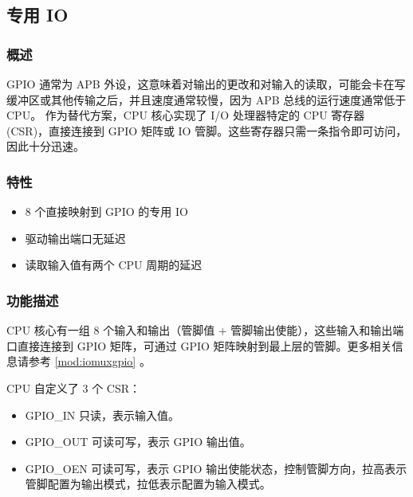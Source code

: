 \documentclass[main\_\_CN.tex]{subfiles}
\begin{document}
\newpage
\subsection{专用 IO}
\label{sec:riscvcpu-fastio}
\subsubsection{概述}
\label{sec:riscvcpu-fastio-overview}

GPIO 通常为 APB 外设，这意味着对输出的更改和对输入的读取，可能会卡在写缓冲区或其他传输之后，并且速度通常较慢，因为 APB 总线的运行速度通常低于 CPU。
作为替代方案，CPU 核心实现了 I/O 处理器特定的 CPU 寄存器 (CSR)，直接连接到 GPIO 矩阵或 IO 管脚。这些寄存器只需一条指令即可访问，因此十分迅速。

\subsubsection{特性}
\label{sec:riscvcpu-fastio-features}
 \begin{itemize}
    \item 8 个直接映射到 GPIO 的专用 IO
    \item 驱动输出端口无延迟
    \item 读取输入值有两个 CPU 周期的延迟
\end{itemize}

\subsubsection{功能描述}
\label{sec:riscvcpu-fastio-func-descr}

CPU 核心有一组 8 个输入和输出（管脚值 + 管脚输出使能），这些输入和输出端口直接连接到 GPIO 矩阵，可通过 GPIO 矩阵映射到最上层的管脚。更多相关信息请参考 \ref{mod:iomuxgpio} \textit{}。

CPU 自定义了 3 个 CSR：
\begin{itemize}
    \item GPIO\_IN 只读，表示输入值。
    \item GPIO\_OUT 可读可写，表示 GPIO 输出值。
    \item GPIO\_OEN 可读可写，表示 GPIO 输出使能状态，控制管脚方向，拉高表示管脚配置为输出模式，拉低表示配置为输入模式。
\end{itemize}

\end{document}
